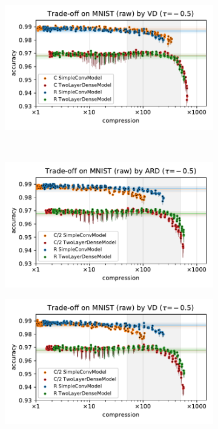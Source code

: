 \documentclass[a4paper,10pt,onecolumn]{article}
\begin{document}
\begin{figure}[b]
\begin{subfigure}[b]{0.5\columnwidth}
  \end{subfigure}%
  \begin{subfigure}[b]{0.5\columnwidth}
    \centering
    \includegraphics[width=\columnwidth]{figure__mnist-like__trade-off/appendix__VD__mnist__raw__-0.5.pdf}
  \end{subfigure} \\ %
  \begin{subfigure}[b]{0.5\columnwidth}
    \centering
    \includegraphics[width=\columnwidth]{figure__mnist-like__trade-off/appendix__cmp__ARD__mnist__raw__-0.5.pdf}
  \end{subfigure}%
  \begin{subfigure}[b]{0.5\columnwidth}
    \centering
    \includegraphics[width=\columnwidth]{figure__mnist-like__trade-off/appendix__cmp__VD__mnist__raw__-0.5.pdf}

\end{subfigure}
\end{figure}
\end{document}
